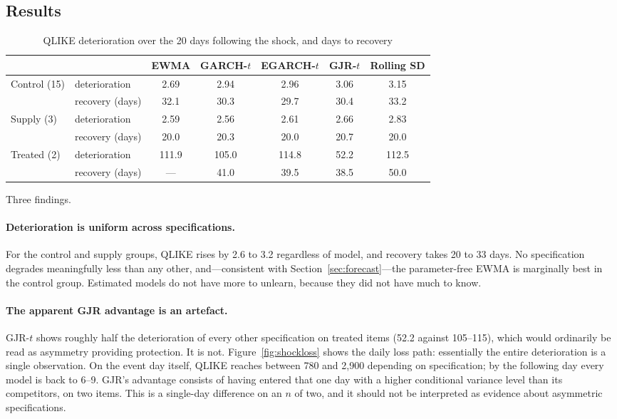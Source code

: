 \documentclass[11pt,a4paper]{article}
\begin{document}
\subsection{Results}

\begin{table}[htbp]
\centering
\caption{QLIKE deterioration over the 20 days following the shock, and days to
recovery}
\label{tab:shockloss}
\begin{tabular}{llccccc}
\toprule
& & EWMA & GARCH-$t$ & EGARCH-$t$ & GJR-$t$ & Rolling SD \\
\midrule
\multirow{2}{*}{Control (15)} & deterioration & 2.69 & 2.94 & 2.96 & 3.06 & 3.15 \\
 & recovery (days) & 32.1 & 30.3 & 29.7 & 30.4 & 33.2 \\[0.3em]
\multirow{2}{*}{Supply (3)} & deterioration & 2.59 & 2.56 & 2.61 & 2.66 & 2.83 \\
 & recovery (days) & 20.0 & 20.3 & 20.0 & 20.7 & 20.0 \\[0.3em]
\multirow{2}{*}{Treated (2)} & deterioration & 111.9 & 105.0 & 114.8 & 52.2 & 112.5 \\
 & recovery (days) & --- & 41.0 & 39.5 & 38.5 & 50.0 \\
\bottomrule
\end{tabular}
\end{table}

Three findings.

\paragraph{Deterioration is uniform across specifications.}
For the control and supply groups, QLIKE rises by 2.6 to 3.2 regardless of
model, and recovery takes 20 to 33 days. No specification degrades
meaningfully less than any other, and---consistent with
Section~\ref{sec:forecast}---the parameter-free EWMA is marginally best in the
control group. Estimated models do not have more to unlearn, because they did
not have much to know.

\paragraph{The apparent GJR advantage is an artefact.}
GJR-$t$ shows roughly half the deterioration of every other specification on
treated items (52.2 against 105--115), which would ordinarily be read as
asymmetry providing protection. It is not. Figure~\ref{fig:shockloss} shows
the daily loss path: essentially the entire deterioration is a single
observation. On the event day itself, QLIKE reaches between 780 and 2{,}900
depending on specification; by the following day every model is back to 6--9.
GJR's advantage consists of having entered that one day with a higher
conditional variance level than its competitors, on two items. This is a
single-day difference on an $n$ of two, and it should not be interpreted as
evidence about asymmetric specifications.
\end{document}
